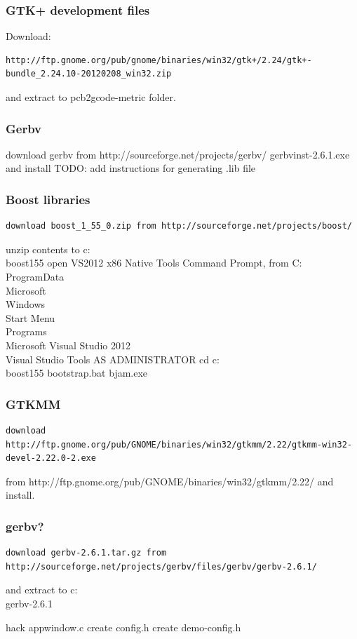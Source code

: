 \documentclass[a4paper,11pt]{article}  %
\begin{document}
\subsubsection{GTK+ development files}
Download:
\begin{lstlisting}[frame=single,breaklines=true]
http://ftp.gnome.org/pub/gnome/binaries/win32/gtk+/2.24/gtk+-bundle_2.24.10-20120208_win32.zip
\end{lstlisting}
and extract to pcb2gcode-metric folder.

\subsubsection{Gerbv}
download gerbv from http://sourceforge.net/projects/gerbv/
gerbvinst-2.6.1.exe and install
TODO: add instructions for generating .lib file

\subsubsection{Boost libraries}
\begin{lstlisting}[frame=single,breaklines=true]
download boost_1_55_0.zip from http://sourceforge.net/projects/boost/
\end{lstlisting}
unzip contents to c:\\boost155
open VS2012 x86 Native Tools Command Prompt, from C:\\ProgramData\\Microsoft\\Windows\\Start Menu\\Programs\\Microsoft Visual Studio 2012\\Visual Studio Tools
AS ADMINISTRATOR
cd c:\\boost155
bootstrap.bat
bjam.exe

\subsubsection{GTKMM}
\begin{lstlisting}[frame=single,breaklines=true]
download http://ftp.gnome.org/pub/GNOME/binaries/win32/gtkmm/2.22/gtkmm-win32-devel-2.22.0-2.exe
\end{lstlisting}
from http://ftp.gnome.org/pub/GNOME/binaries/win32/gtkmm/2.22/
and install.

\subsubsection{gerbv?}
\begin{lstlisting}[frame=single,breaklines=true]
download gerbv-2.6.1.tar.gz from http://sourceforge.net/projects/gerbv/files/gerbv/gerbv-2.6.1/
\end{lstlisting}
and extract to c:\\gerbv-2.6.1

hack appwindow.c
create config.h
create demo-config.h
\end{document}
